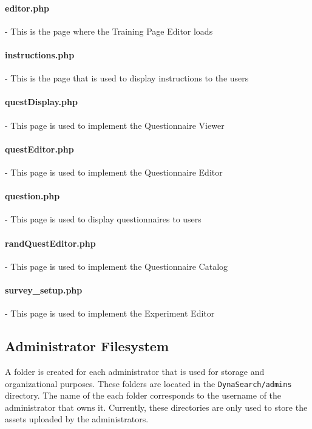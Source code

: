 \documentclass[article]{ij4uq}              %
\begin{document}
\paragraph{editor.php} - This is the page where the Training Page Editor loads

\paragraph{instructions.php} - This is the page that is used to display instructions to the users 

\paragraph{questDisplay.php} - This page is used to implement the Questionnaire Viewer

\paragraph{questEditor.php} - This page is used to implement the Questionnaire Editor 

\paragraph{question.php} - This page is used to display questionnaires to users 

\paragraph{randQuestEditor.php} - This page is used to implement the Questionnaire Catalog 

\paragraph{survey\_setup.php} - This page is used to implement the Experiment Editor

\subsection{Administrator Filesystem}
A folder is created for each administrator that is used for storage and organizational purposes.  These folders are located in the \texttt{DynaSearch/admins} directory.  The name of the each folder corresponds to the username of the administrator that owns it.  Currently, these directories are only used to store the assets uploaded by the administrators.
\end{document}
